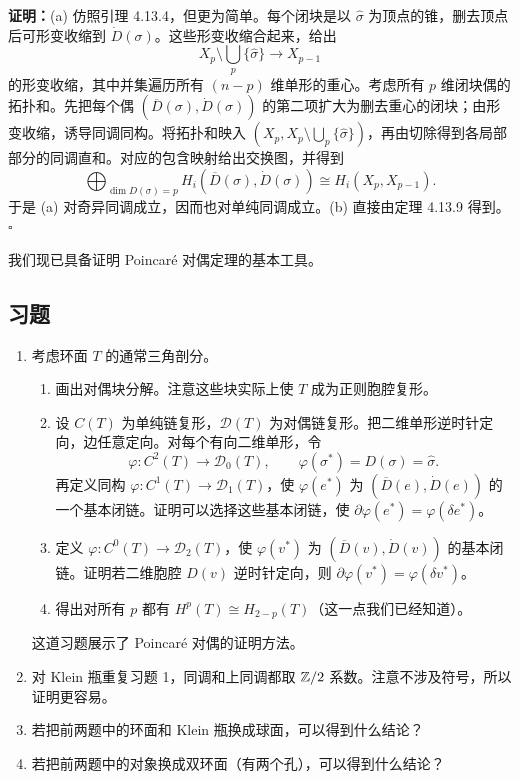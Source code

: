 \textbf{证明：}(a) 仿照引理 4.13.4，但更为简单。每个闭块是以 $\widehat\sigma$ 为顶点的锥，删去顶点后可形变收缩到 $\dot D(\sigma)$。这些形变收缩合起来，给出
\[X_p\setminus\bigcup_p\{\widehat\sigma\}\longrightarrow X_{p-1}\]
的形变收缩，其中并集遍历所有 $(n-p)$ 维单形的重心。考虑所有 $p$ 维闭块偶的拓扑和。先把每个偶 $(\overline D(\sigma),\dot D(\sigma))$ 的第二项扩大为删去重心的闭块；由形变收缩，诱导同调同构。将拓扑和映入 $(X_p,X_p\setminus\bigcup_p\{\widehat\sigma\})$，再由切除得到各局部部分的同调直和。对应的包含映射给出交换图，并得到
\[
\bigoplus_{\dim D(\sigma)=p}H_i(\overline D(\sigma),\dot D(\sigma))
\cong H_i(X_p,X_{p-1}).
\]
于是 (a) 对奇异同调成立，因而也对单纯同调成立。(b) 直接由定理 4.13.9 得到。\hfill$\square$

我们现已具备证明 Poincaré 对偶定理的基本工具。

\subsection*{习题}
\begin{enumerate}
\item 考虑环面 $T$ 的通常三角剖分。
\begin{enumerate}[label=(\alph*)]
\item 画出对偶块分解。注意这些块实际上使 $T$ 成为正则胞腔复形。
\item 设 $C(T)$ 为单纯链复形，$\mathcal D(T)$ 为对偶链复形。把二维单形逆时针定向，边任意定向。对每个有向二维单形，令
\[\varphi:C^2(T)\to\mathcal D_0(T),\qquad\varphi(\sigma^*)=D(\sigma)=\widehat\sigma.\]
再定义同构 $\varphi:C^1(T)\to\mathcal D_1(T)$，使 $\varphi(e^*)$ 为 $(\overline D(e),\dot D(e))$ 的一个基本闭链。证明可以选择这些基本闭链，使 $\partial\varphi(e^*)=\varphi(\delta e^*)$。
\item 定义 $\varphi:C^0(T)\to\mathcal D_2(T)$，使 $\varphi(v^*)$ 为 $(\overline D(v),\dot D(v))$ 的基本闭链。证明若二维胞腔 $D(v)$ 逆时针定向，则 $\partial\varphi(v^*)=\varphi(\delta v^*)$。
\item 得出对所有 $p$ 都有 $H^p(T)\cong H_{2-p}(T)$（这一点我们已经知道）。
\end{enumerate}
这道习题展示了 Poincaré 对偶的证明方法。
\item 对 Klein 瓶重复习题 1，同调和上同调都取 $\mathbb{Z}/2$ 系数。注意不涉及符号，所以证明更容易。
\item 若把前两题中的环面和 Klein 瓶换成球面，可以得到什么结论？
\item 若把前两题中的对象换成双环面（有两个孔），可以得到什么结论？
\end{enumerate}
